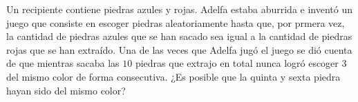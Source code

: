 \begin{problem}
	Un recipiente contiene piedras azules y rojas. Adelfa estaba aburrida e inventó un juego que consiste en escoger piedras aleatoriamente hasta que, por prmera vez, la cantidad de piedras azules que se han sacado sea igual a la cantidad de piedras rojas que se han extraído. Una de las veces que Adelfa jugó el juego se dió cuenta de que mientras sacaba las $10$ piedras que extrajo en total nunca logró escoger $3$ del mismo color de forma consecutiva. ¿Es posible que la quinta y sexta piedra hayan sido del mismo color?
\end{problem}